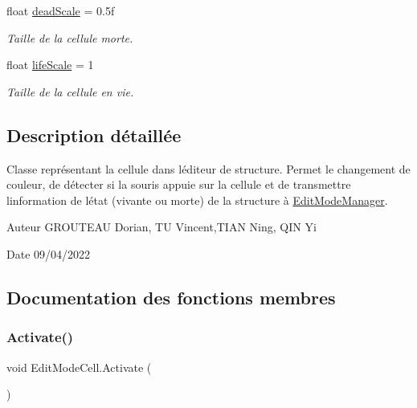 \begin{DoxyCompactItemize}
float \mbox{\hyperlink{class_edit_mode_cell_a218a9e576e1ad84cd0268f0f0009d628}{dead\+Scale}} = 0.\+5f
\begin{DoxyCompactList}\small\item\em Taille de la cellule morte. \end{DoxyCompactList}\item 
float \mbox{\hyperlink{class_edit_mode_cell_a80c89ea3030a80cb4f2e26accd00c2cb}{life\+Scale}} = 1
\begin{DoxyCompactList}\small\item\em Taille de la cellule en vie. \end{DoxyCompactList}\end{DoxyCompactItemize}


\subsection{Description détaillée}
Classe représentant la cellule dans l\textquotesingle{}éditeur de structure. Permet le changement de couleur, de détecter si la souris appuie sur la cellule et de transmettre l\textquotesingle{}information de l\textquotesingle{}état (vivante ou morte) de la structure à \mbox{\hyperlink{class_edit_mode_manager}{Edit\+Mode\+Manager}}. 

\begin{DoxyAuthor}{Auteur}
G\+R\+O\+U\+T\+E\+AU Dorian, TU Vincent,T\+I\+AN Ning, Q\+IN Yi 
\end{DoxyAuthor}
\begin{DoxyDate}{Date}
09/04/2022 
\end{DoxyDate}


\subsection{Documentation des fonctions membres}
\mbox{\label{class_edit_mode_cell_ab29acfb84a03e3d04805cb16ba5b4af8}} 
\subsubsection{\texorpdfstring{Activate()}{Activate()}}
{\footnotesize\ttfamily void Edit\+Mode\+Cell.\+Activate (\begin{DoxyParamCaption}{ }\end{DoxyParamCaption})\hspace{0.3cm}{\ttfamily [inline]}}



